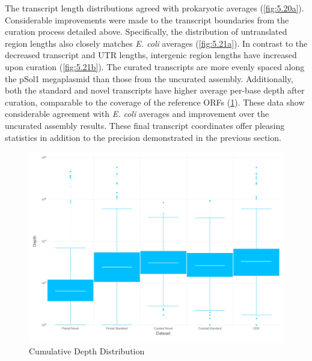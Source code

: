 The transcript length distributions agreed with prokaryotic averages (\ref{fig:5.20a}). Considerable improvements were made to the transcript boundaries from the curation process detailed above. Specifically, the distribution of untranslated region lengths also closely matches \textit{E. coli} averages\cite{87} (\ref{fig:5.21a}). In contrast to the decreased transcript and UTR lengths, intergenic region lengths have increased upon curation (\ref{fig:5.21b}). The curated transcripts are more evenly spaced along the pSol1 megaplasmid than those from the uncurated assembly. Additionally, both the standard and novel transcripts have higher average per-base depth after curation, comparable to the coverage of the reference ORFs (\ref{fig:5.22}). These data show considerable agreement with \textit{E. coli} averages and improvement over the uncurated assembly results. These final transcript coordinates offer pleasing statistics in addition to the precision demonstrated in the previous section.



\begin{figure}
\includegraphics[width=\textwidth]{images/Assembly/Curation/CurvsUncur_boxplot.png}
\caption{Cumulative Depth Distribution}\label{fig:5.22}
\end{figure}


